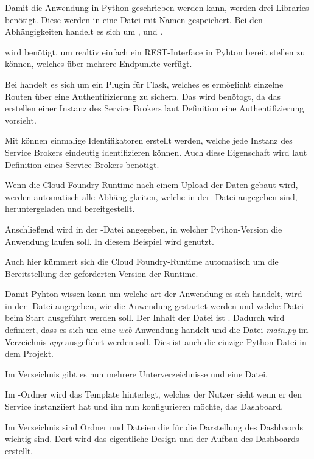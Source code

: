 Damit die Anwendung in Python geschrieben werden kann, werden drei Libraries benötigt. Diese werden in eine Datei mit
Namen  gespeichert. Bei den Abhängigkeiten handelt es sich um , 
und .

 wird benötigt, um realtiv einfach ein REST-Interface in Pyhton bereit stellen zu können, welches über
mehrere Endpunkte verfügt.

Bei  handelt es sich um ein Plugin für Flask, welches es ermöglicht einzelne Routen über eine
Authentifizierung zu sichern. Das wird benötogt, da das erstellen einer Instanz des Service Brokers laut Definition eine
Authentifizierung vorsieht.

Mit  können einmalige Identifikatoren erstellt werden, welche jede Instanz des Service Brokers eindeutig
identifizieren können. Auch diese Eigenschaft wird laut Definition eines Service Brokers benötigt.

Wenn die Cloud Foundry-Runtime nach einem Upload der Daten gebaut wird, werden automatisch alle Abhängigkeiten, welche
in der -Datei angegeben sind, heruntergeladen und bereitgestellt.

Anschließend wird in der -Datei angegeben, in welcher Python-Version die Anwendung laufen soll. In diesem
Beispiel wird  genutzt.

Auch hier kümmert sich die Cloud Foundry-Runtime automatisch um die Bereitstellung der geforderten Version der Runtime.

Damit Pyhton wissen kann um welche art der Anwendung es sich handelt, wird in der -Datei angegeben, wie
die Anwendung gestartet werden und welche Datei beim Start ausgeführt werden soll. Der Inhalt der Datei ist
. Dadurch wird definiert, dass es sich um eine \textit{web}-Anwendung handelt und die Datei
\textit{main.py} im Verzeichnis \textit{app} ausgeführt werden soll. Dies ist auch die einzige Python-Datei in dem
Projekt.

Im Verzeichnis  gibt es nun mehrere Unterverzeichnisse und eine Datei.

Im -Ordner wird das Template hinterlegt, welches der Nutzer sieht wenn er den Service instanziiert
hat und ihn nun konfigurieren möchte, das Dashboard.

Im  Verzeichnis sind Ordner und Dateien die für die Darstellung des Dashbaords wichtig sind. Dort wird
das eigentliche Design und der Aufbau des Dashboards erstellt.

